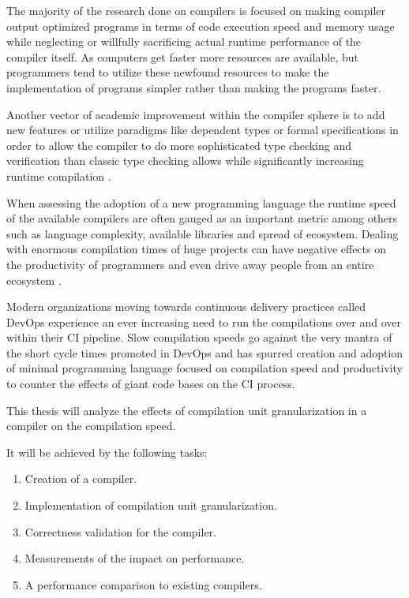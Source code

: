 \documentclass{VUMIFPSbakalaurinis}
\begin{document}
The majority of the research done on compilers is focused on making compiler output optimized programs in terms of code execution speed and memory usage \cite{lopes2018future} while neglecting or willfully sacrificing \cite{fast2019compilers} actual runtime performance of the compiler itself.
As computers get faster more resources are available, but programmers tend to utilize these newfound resources to make the implementation of programs simpler rather than making the programs faster\cite{Wirth1995}.

Another vector of academic improvement within the compiler sphere is to add new features or utilize paradigms like dependent types or formal specifications\cite{RustVerification} in order to allow the compiler to do more sophisticated type checking and verification than classic type checking allows while significantly increasing runtime compilation .

When assessing the adoption of a new programming language the runtime speed of the available compilers are often gauged as an important metric\cite{ScalaSlow} among others such as language complexity, available libraries and spread of ecosystem.
Dealing with enormous compilation times of huge projects can have negative effects on the productivity of programmers and even drive away people from an entire ecosystem \cite{ScalaReallySlow, ScalaSlow}.

Modern organizations moving towards continuous delivery practices called DevOps \cite{DevOps} experience an ever increasing need to run the compilations over and over within their CI pipeline.
Slow compilation speeds go against the very mantra of the short cycle times promoted in DevOps and has spurred creation and adoption of minimal programming language focused on compilation speed and productivity to counter the effects of giant code bases on the CI process\cite{TheGoProgrammingLanguage, GoGoogle}.

This thesis will analyze the effects of compilation unit granularization in a compiler on the compilation speed.

It will be achieved by the following tasks:

\begin{enumerate}
\item{Creation of a compiler.}
\item{Implementation of compilation unit granularization.}
\item{Correctness validation for the compiler.}
\item{Measurements of the impact on performance.}
\item{A performance comparison to existing compilers.}
\end{enumerate}
\end{document}
